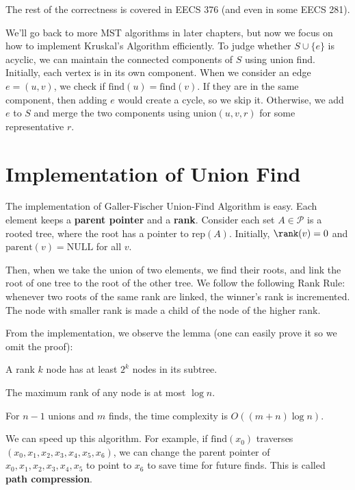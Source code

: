 The rest of the correctness is covered in EECS 376 (and even in some EECS 281).

We'll go back to more MST algorithms in later chapters, but now we focus on how to implement Kruskal's Algorithm efficiently. To judge whether $S\cup \{e\}$ is acyclic, we can maintain the connected components of $S$ using union find. Initially, each vertex is in its own component. When we consider an edge $e=(u,v)$, we check if $\text{find}(u)=\text{find}(v)$. If they are in the same component, then adding $e$ would create a cycle, so we skip it. Otherwise, we add $e$ to $S$ and merge the two components using $\text{union}(u,v,r)$ for some representative $r$.

\section{Implementation of Union Find}

The implementation of Galler-Fischer Union-Find Algorithm is easy. Each element keeps a \textbf{parent pointer} and a \textbf{rank}. Consider each set $A\in \mathcal P$ is a rooted tree, where the root has a pointer to $\text{rep}(A)$. Initially, $\rank(v) = 0$ and $\text{parent}(v) = \text{NULL}$ for all $v$.

Then, when we take the union of two elements, we find their roots, and link the root of one tree to the root of the other tree. We follow the following Rank Rule: whenever two roots of the same rank are linked, the winner's rank is incremented. The node with smaller rank is made a child of the node of the higher rank.

From the implementation, we observe the lemma (one can easily prove it so we omit the proof):
\begin{lemma}
	A rank $k$ node has at least $2^k$ nodes in its subtree. \label{lemma:rank}
\end{lemma}
\begin{corollary}
	The maximum rank of any node is at most $\log n$.
\end{corollary}
\begin{theorem}
	For $n-1$ unions and $m$ finds, the time complexity is $O((m+n)\log n)$.
\end{theorem}

We can speed up this algorithm. For example, if $\text{find}(x_0)$ traverses $(x_0, x_1, x_2, x_3, x_4, x_5, x_6)$, we can change the parent pointer of $x_0, x_1, x_2, x_3, x_4, x_5$ to point to $x_6$ to save time for future finds. This is called \textbf{path compression}.

